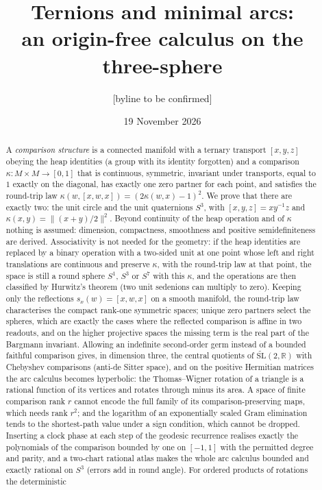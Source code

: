 \documentclass[11pt,reqno]{amsart}
\title[Ternions and minimal arcs]{Ternions and minimal arcs:\\ an origin-free calculus on the three-sphere}
\author{[byline to be confirmed]}
\date{19 November 2026}
\theoremstyle{definition}
\theoremstyle{remark}
\numberwithin{equation}{section}
\newcommand{\R}{\mathbb{R}}
\newcommand{\hp}[3]{[#1,#2,#3]}
\begin{document}
\raggedbottom

\begin{abstract}
A \emph{comparison structure} is a connected manifold with a ternary transport $\hp xyz$ obeying the
heap identities (a group with its identity forgotten) and a comparison $\kappa\colon M\times M\to[0,1]$ that is continuous,
symmetric, invariant under transports, equal to $1$ exactly on the diagonal, has exactly one zero partner for each point, and
satisfies the round-trip law $\kappa(w,\hp xwx)=(2\kappa(w,x)-1)^2$.  We prove that there are exactly two: the unit circle and the
unit quaternions $S^3$, with $\hp xyz=xy^{-1}z$ and $\kappa(x,y)=\lVert(x+y)/2\rVert^2$.  Beyond continuity of the heap operation and of
$\kappa$ nothing is assumed: dimension, compactness, smoothness and positive semidefiniteness are derived.  Associativity is not needed for the
geometry: if the heap identities are replaced by a binary operation with a two-sided unit at one point whose left and right
translations are continuous and preserve $\kappa$, with the round-trip law at that point, the space is still a round sphere $S^1$, $S^3$ or $S^7$ with
this $\kappa$, and the operations are then classified by Hurwitz's theorem (two unit sedenions can multiply to zero).  Keeping only the reflections $s_x(w)=\hp xwx$ on a smooth manifold, the
round-trip law characterises the compact rank-one symmetric spaces; unique zero partners select the spheres, which are exactly the cases
where the reflected comparison is affine in two readouts, and on the higher projective spaces the missing term is the real part of the
Bargmann invariant.  Allowing an indefinite second-order germ instead of a bounded faithful comparison gives, in dimension three, the
central quotients of $\widetilde{\mathrm{SL}}(2,\R)$ with Chebyshev comparisons (anti-de Sitter space), and on the positive Hermitian
matrices the arc calculus becomes hyperbolic: the Thomas--Wigner rotation of a triangle is a rational function of its vertices and
rotates through minus its area.  A space of finite comparison rank $r$ cannot encode the full family of its
comparison-preserving maps, which needs rank $r^2$; and the logarithm of an exponentially scaled Gram elimination tends to the
shortest-path value under a sign condition, which cannot be dropped.  Inserting a clock phase at each step of the geodesic recurrence
realises exactly the polynomials of the comparison bounded by one on $[-1,1]$ with the permitted degree and parity, and a two-chart
rational atlas makes the whole arc calculus bounded and exactly rational on $S^3$ (errors add in round angle).  For ordered products of rotations the deterministic

\end{abstract}
\end{document}
